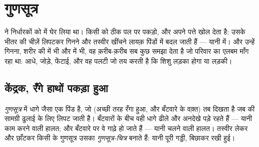 \chapter{गुणसूत्र}\label{ch:g9:chromosomes}

 ने निर्धारकों को  में
घेर लिया था। किसी  को ठीक पल पर पकड़ो, और  अपने पत्ते खोल
देता है: उसके भीतर की चीज़ें लिपटकर गिनने और तस्वीर खींचने लायक़ पिंडों
में बदल जाती हैं --- यानी  में। और उन्हें गिनना, शरीर की
 में भी और  में भी, वह क़रीब-क़रीब सब कुछ समझा देता है जो
परिवार का एलबम माँग रहा था: आधे, जोड़े, फेंटाई, और वह पलटी जो तय करती है
कि शिशु लड़का होगा या लड़की।

\section{केंद्रक, रँगे हाथों पकड़ा हुआ}

\begin{definition}[गुणसूत्र]\label{def:g9:chromosomes:chromosomes}
\emph{गुणसूत्र}  में धागे जैसा एक पिंड है, जो
(अच्छी तरह रँगा हुआ, और बँटवारे के वक़्त) तब दिखता है जब  की
सामग्री ढुलाई के लिए लिपट जाती है। बँटवारों के बीच वही धागे ढीले और अनदेखे
पड़े रहते हैं --- यानी काम करने वाली हालत; और बँटवारे पर वे गाढ़े हो जाते
हैं --- यानी चलने वाली हालत। तस्वीर लेकर और छाँटकर किसी  के
गुणसूत्र उसका \emph{गुणसूत्र-चित्र} बनाते हैं:
यानी पूरी गड्डी, बिछाकर रखी हुई।
\end{definition}

